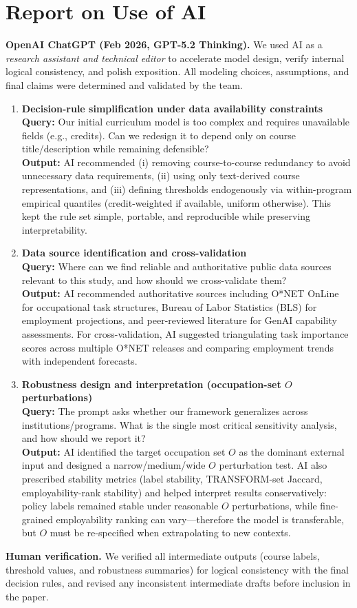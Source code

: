 \section*{Report on Use of AI}
\label{sec:ai_report}

\textbf{OpenAI ChatGPT (Feb 2026, GPT-5.2 Thinking).}
We used AI as a \emph{research assistant and technical editor} to accelerate model design, verify internal logical consistency, and polish exposition. All modeling choices, assumptions, and final claims were determined and validated by the team.

\begin{enumerate}
   

    \item \textbf{Decision-rule simplification under data availability constraints}\\
    \textbf{Query:} Our initial curriculum model is too complex and requires unavailable fields (e.g., credits). Can we redesign it to depend only on course title/description while remaining defensible?\\
    \textbf{Output:} AI recommended (i) removing course-to-course redundancy to avoid unnecessary data requirements, (ii) using only text-derived course representations, and (iii) defining thresholds endogenously via within-program empirical quantiles (credit-weighted if available, uniform otherwise). This kept the rule set simple, portable, and reproducible while preserving interpretability.

    \item \textbf{Data source identification and cross-validation}\\
    \textbf{Query:} Where can we find reliable and authoritative public data sources relevant to this study, and how should we cross-validate them?\\
    \textbf{Output:} AI recommended authoritative sources including O*NET OnLine for occupational task structures, Bureau of Labor Statistics (BLS) for employment projections, and peer-reviewed literature for GenAI capability assessments. For cross-validation, AI suggested triangulating task importance scores across multiple O*NET releases and comparing employment trends with independent forecasts.

    \item \textbf{Robustness design and interpretation (occupation-set $O$ perturbations)}\\
    \textbf{Query:} The prompt asks whether our framework generalizes across institutions/programs. What is the single most critical sensitivity analysis, and how should we report it?\\
    \textbf{Output:} AI identified the target occupation set $O$ as the dominant external input and designed a narrow/medium/wide $O$ perturbation test. AI also prescribed stability metrics (label stability, TRANSFORM-set Jaccard, employability-rank stability) and helped interpret results conservatively: policy labels remained stable under reasonable $O$ perturbations, while fine-grained employability ranking can vary---therefore the model is transferable, but $O$ must be re-specified when extrapolating to new contexts.

\end{enumerate}

\textbf{Human verification.} We verified all intermediate outputs (course labels, threshold values, and robustness summaries) for logical consistency with the final decision rules, and revised any inconsistent intermediate drafts before inclusion in the paper.
